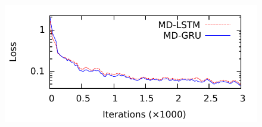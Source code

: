 \documentclass[varwidth=true, border=10pt, convert={size=640x}]{standalone}
\begin{document}
\begin{figure}
 \centering

  \begin{minipage}{0.80\textwidth}
    \includegraphics[width=.9\linewidth]{./images/convergence_rate_new10000_mediumlines_withtitle6.pdf}
  \end{minipage}
\label{feasibilityqualitative}

\end{figure}
\end{document}
